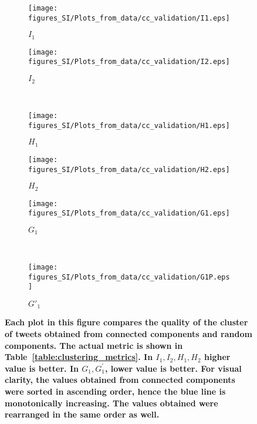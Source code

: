 \begin{figure}
  \centering
  \begin{subfigure}[b]{0.3\textwidth}
    \texttt{[image: figures\_SI/Plots\_from\_data/cc\_validation/I1.eps]}
    \caption{$I_1$} \label{fig:I1}
  \end{subfigure}
  \begin{subfigure}[b]{0.3\textwidth}
    \texttt{[image: figures\_SI/Plots\_from\_data/cc\_validation/I2.eps]}
    \caption{$I_2$} \label{fig:I2}
  \end{subfigure} ~ %
  \begin{subfigure}[b]{0.3\textwidth}
    \texttt{[image: figures\_SI/Plots\_from\_data/cc\_validation/H1.eps]}
    \caption{$H_1$} \label{fig:H1}
  \end{subfigure}

  \begin{subfigure}[b]{0.3\textwidth}
    \texttt{[image: figures\_SI/Plots\_from\_data/cc\_validation/H2.eps]}
    \caption{$H_2$} \label{fig:H2}
  \end{subfigure}
  \begin{subfigure}[b]{0.3\textwidth}
    \texttt{[image: figures\_SI/Plots\_from\_data/cc\_validation/G1.eps]}
    \caption{$G_1$} \label{fig:G1}
  \end{subfigure} ~ %
  \begin{subfigure}[b]{0.3\textwidth}
    \texttt{[image: figures\_SI/Plots\_from\_data/cc\_validation/G1P.eps]}
    \caption{$G'_1$} \label{fig:G1P}
  \end{subfigure}

  \caption{\textbf{Each plot in this figure compares the
          quality of the cluster of tweets obtained from connected
          components and random components. The actual metric is shown
          in Table~\ref{table:clustering_metrics}. In $I_1, I_2, H_1,
          H_2$ higher value is better. In $G_1, G_1^{'}$, lower value
          is better. For visual clarity, the values obtained from
          connected components were sorted in ascending order, hence
          the blue line is monotonically increasing. The values
          obtained were rearranged in the same order as well.}}
    \label{fig:connected_components_validation}
\end{figure}



